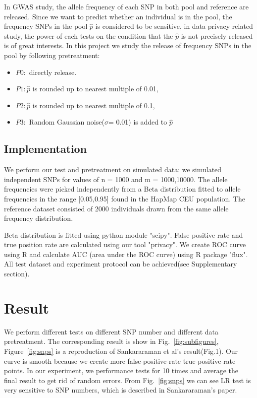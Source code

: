 \documentclass[12pt, singlespace]{article}
\begin{document}
In GWAS study, the allele frequency of each SNP in both pool and reference are released. Since we want to predict whether an individual is in the pool, the frequency SNPs in the pool $\hat{p}$ is considered to be sensitive, in data privacy related study, the power of each tests on the condition that the $\hat{p}$ is not precisely released is of great interests. In this project we study the release of frequency SNPs in the pool by following pretreatment:

\begin{itemize}
\item $P0:$ directly release.

\item $P1:\hat{p}$ is rounded up to nearest multiple of 0.01,

\item $P2:\hat{p}$ is rounded up to nearest multiple of 0.1,

\item $P3:$ Random Gaussian noise($\sigma$= 0.01) is added to $\hat{p}$

\end{itemize}

\subsection{Implementation}

We perform our test and pretreatment on simulated data: we simulated independent SNPs for values of n = 1000 and m = 1000,10000.
The allele frequencies were picked independently from a Beta distribution fitted to
allele frequencies in the range [0.05,0.95] found in the HapMap CEU population.  
The reference dataset consisted of 2000 individuals drawn from the same allele
frequency distribution. 

Beta distribution is fitted using python module "scipy". False positive rate and true position rate are calculated using our tool "privacy". We create ROC curve using R and calculate AUC (area under the ROC curve) using R package "flux". All test dataset and experiment protocol can be achieved(see Supplementary section).


\section{Result}

We perform different tests on different SNP number and different data pretreatment. The corresponding result is show in Fig.~\ref{fig:subfigures}, Figure~\ref{fig:snps} is a reproduction of Sankararaman et al's result(Fig.1). Our curve is smooth because we create more false-positive-rate true-positive-rate points. In our experiment, we performance tests for 10 times and average the final result to get rid of random errors. From Fig.~\ref{fig:snps} we can see LR test is very sensitive to SNP numbers, which is described in Sankararaman's paper.
\end{document}
